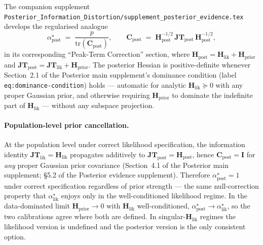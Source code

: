 \documentclass[11pt]{article}
\begin{document}
The companion supplement \texttt{Posterior\_Information\_Distortion/sup\-ple\-ment\_pos\-ter\-i\-or\_ev\-i\-dence.tex} develops the regularised analogue
\begin{equation}
\alpha^\star_{\mathrm{post}}
\;=\;
\frac{p}{\mathrm{tr}(\mathbf C_{\mathrm{post}})},
\qquad
\mathbf C_{\mathrm{post}}
\;=\;
\mathbf H_{\mathrm{post}}^{-1/2}\,\mathbf{JT}_{\mathrm{post}}\,\mathbf H_{\mathrm{post}}^{-1/2},
\end{equation}
in its corresponding ``Peak-Term Correction'' section, where $\mathbf H_{\mathrm{post}} = \mathbf H_{\mathrm{lik}} + \mathbf H_{\mathrm{prior}}$ and $\mathbf{JT}_{\mathrm{post}} = \mathbf{JT}_{\mathrm{lik}} + \mathbf H_{\mathrm{prior}}$. The posterior Hessian is positive-definite whenever Section~2.1 of the Posterior main supplement's dominance condition (label \texttt{eq:dominance-condition}) holds --- automatic for analytic $\mathbf H_{\mathrm{lik}} \succeq 0$ with any proper Gaussian prior, and otherwise requiring $\mathbf H_{\mathrm{prior}}$ to dominate the indefinite part of $\mathbf H_{\mathrm{lik}}$ --- without any subspace projection.

\paragraph{Population-level prior cancellation.}
At the population level under correct likelihood specification, the information identity $\mathbf{JT}_{\mathrm{lik}} = \mathbf H_{\mathrm{lik}}$ propagates additively to $\mathbf{JT}_{\mathrm{post}} = \mathbf H_{\mathrm{post}}$, hence $\mathbf C_{\mathrm{post}} = \mathbf I$ for \emph{any} proper Gaussian prior covariance (Section~4.1 of the Posterior main supplement; \S5.2 of the Posterior evidence supplement). Therefore $\alpha^\star_{\mathrm{post}} = 1$ under correct specification regardless of prior strength --- the same null-correction property that $\alpha^\star_{\mathrm{lik}}$ enjoys only in the well-conditioned likelihood regime. In the data-dominated limit $\mathbf H_{\mathrm{prior}} \to 0$ with $\mathbf H_{\mathrm{lik}}$ well-conditioned, $\alpha^\star_{\mathrm{post}} \to \alpha^\star_{\mathrm{lik}}$, so the two calibrations agree where both are defined. In singular-$\mathbf H_{\mathrm{lik}}$ regimes the likelihood version is undefined and the posterior version is the only consistent option.
\end{document}
